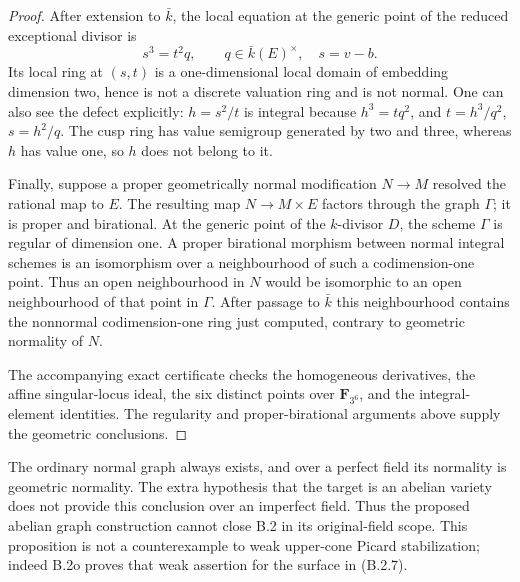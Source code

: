 \begin{proof}
After extension to $\bar k$, the local equation at the generic
point of the reduced exceptional divisor is
\[
            s^3=t^2q,\qquad q\in\bar k(E)^\times,
            \quad s=v-b.
\]
Its local ring at $(s,t)$ is a one-dimensional local domain
of embedding dimension two, hence is not a discrete valuation
ring and is not normal.  One can also see the defect explicitly:
$h=s^2/t$ is integral because $h^3=tq^2$, and
$t=h^3/q^2$, $s=h^2/q$.  The cusp ring has value semigroup
generated by two and three, whereas $h$ has value one, so
$h$ does not belong to it.

Finally, suppose a proper geometrically normal modification
$N\to M$ resolved the rational map to $E$.  The resulting
map $N\to M\times E$ factors through the graph $\Gamma$;
it is proper and birational.  At the generic point of the
$k$-divisor $D$, the scheme $\Gamma$ is regular of dimension
one.  A proper birational morphism between normal integral
schemes is an isomorphism over a neighbourhood of such a
codimension-one point.  Thus an open neighbourhood in $N$
would be isomorphic to an open neighbourhood of that point
in $\Gamma$.  After passage to $\bar k$ this neighbourhood
contains the nonnormal codimension-one ring just computed,
contrary to geometric normality of $N$.

The accompanying exact certificate checks the homogeneous
derivatives, the affine singular-locus ideal, the six distinct
points over $\mathbf F_{3^6}$, and the integral-element
identities.  The regularity and proper-birational arguments
above supply the geometric conclusions.
\end{proof}

\begin{remark}
The ordinary normal graph always exists, and over a perfect
field its normality is geometric normality.  The extra hypothesis
that the target is an abelian variety does not provide this
conclusion over an imperfect field.  Thus the proposed abelian
graph construction cannot close B.2 in its original-field scope.
This proposition is not a counterexample to weak upper-cone
Picard stabilization; indeed B.2o proves that weak assertion for
the surface in (B.2.7).
\end{remark}
